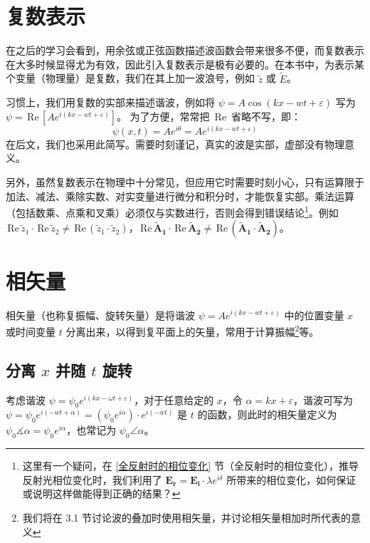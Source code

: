 \documentclass[UTF8]{report}
\def\Re{\mathrm{\,Re}\,}
\theoremstyle{MyLineTheoremStyle} %
\theoremstyle{MyBlockTheoremStyle} %
\theoremstyle{MySubsubsectionStyle} %
\begin{document}
\section{复数表示}
在之后的学习会看到，用余弦或正弦函数描述波函数会带来很多不便，而复数表示在大多时候显得尤为有效，因此引入复数表示是极有必要的。在本书中，为表示某个变量（物理量）是复数，我们在其上加一波浪号，例如 $\tilde{z}$ 或 $\tilde{E}$。

习惯上，我们用复数的实部来描述谐波，例如将 $\psi = A \cos(kx - wt + \varepsilon)$ 写为 $\psi = \Re [A e^{i (kx - wt + \varepsilon)}]$。
为了方便，常常把 $\Re$ 省略不写，即：
\begin{equation}
    \psi(x,t) = A e^{i \theta} = A e^{i (kx - wt + \varepsilon)}
\end{equation}
在后文，我们也采用此简写。需要时刻谨记，真实的波是实部，虚部没有物理意义。

另外，虽然复数表示在物理中十分常见，但应用它时需要时刻小心，只有运算限于加法、减法、乘除实数、对实变量进行微分和积分时，才能恢复实部。乘法运算（包括数乘、点乘和叉乘）必须仅与实数进行，否则会得到错误结论\footnote{这里有一个疑问，在 \ref{全反射时的相位变化} 节（全反射时的相位变化），推导反射光相位变化时，我们利用了 $\boldsymbol{E_r} = \boldsymbol{E_i}\cdot \lambda e^{i \delta} $ 所带来的相位变化，如何保证或说明这样做能得到正确的结果？}。例如 $\Re \tilde{z}_1 \cdot \Re \tilde{z}_2 \ne \Re (\tilde{z}_1\cdot \tilde{z}_2)$，$\Re \boldsymbol{\tilde{A}_1 }\cdot \Re \boldsymbol{\tilde{A}_2 }\ne \Re (\boldsymbol{\tilde{A}_1} \cdot \boldsymbol{\tilde{A}_2})$。

\section{相矢量}\label{相矢量}

相矢量（也称复振幅、旋转矢量）是将谐波 $\psi = A e^{i (kx - wt + \varepsilon)}$ 中的位置变量 $x$ 或时间变量 $t$ 分离出来，以得到复平面上的矢量，常用于计算振幅\footnote{我们将在 3.1 节讨论波的叠加时使用相矢量，并讨论相矢量相加时所代表的意义}等。

\subsection{分离 $x$ 并随 $t$ 旋转}

考虑谐波 $\psi = \psi_0 e^{i(kx - \omega t + \varepsilon)}$，对于任意给定的 $x$，令 $\alpha = kx + \varepsilon$，谐波可写为 $\psi = \psi_0 e^{i(- wt + \alpha)} = (\psi_0 e^{i \alpha})\cdot e^{i(- wt)} $ 是 $t$ 的函数，则此时的相矢量定义为 $ \psi_0 \measuredangle \alpha = \psi_0 e^{i \alpha}$，也常记为 $\psi_0 \angle \alpha$。
\end{document}
